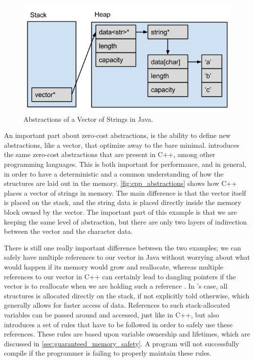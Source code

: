 \begin{figure}[tb]
  \begin{center}
    \includegraphics[scale=0.5]{figures/java_abstractions}
  \end{center}
  \caption{Abstractions of a Vector of Strings in Java.}
  \label{fig:java_abstractions}
\end{figure}

An important part about zero-cost abstractions, is the ability to define new abstractions, like a vector, that optimize away to the bare minimal.
\rust introduces the same zero-cost abstractions that are present in C++, among other programming languages.
This is both important for performance, and in general, in order to have a deterministic and a common understanding of how the structures are laid out in the memory.
\autoref{fig:cpp_abstractions} shows how C++ places a vector of strings in memory.
The main difference is that the vector itself is placed on the stack, and the string data is placed directly inside the memory block owned by the vector.
The important part of this example is that we are keeping the same level of abstraction, but there are only two layers of indirection between the vector and the character data.

There is still one really important difference between the two examples; we can safely have multiple references to our vector in Java without worrying about what would happen if its memory would grow and reallocate, whereas multiple references to our vector in C++ can certainly lead to dangling pointers if the vector is to reallocate when we are holding such a reference
.
In \rust's case, all structures is allocated directly on the stack, if not explicitly told otherwise, which generally allows for faster access of data.
References to such stack-allocated variables can be passed around and accessed, just like in C++,
but \rust also introduces a set of rules that have to be followed in order to safely use these references.
These rules are based upon variable ownership and lifetimes, which are discussed in \autoref{sec:guaranteed_memory_safety}.
A \rust program will not successfully compile if the programmer is failing to properly maintain these rules.

